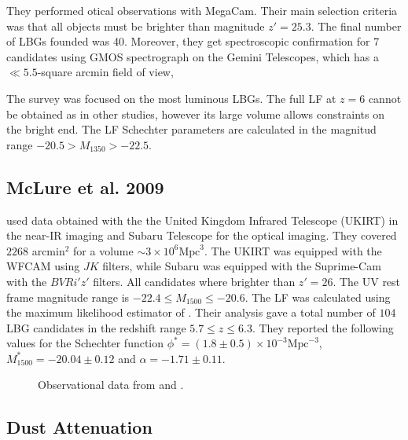 \documentclass{emulateapj}
\begin{document}
They performed otical observations with MegaCam.
Their main selection criteria was that all objects must be brighter
than magnitude $z' = 25.3$. 
The final  number of LBGs founded was 40. 
Moreover, they get spectroscopic confirmation 
for 7 candidates using GMOS spectrograph on the Gemini Telescopes, which 
has a $\ll 5.5$-square arcmin field of view, 

The survey was focused on the most luminous LBGs. 
The full LF at $z=6$ cannot be obtained as in other studies, however
its large volume allows constraints on the bright end.
The LF Schechter parameters are calculated in the magnitud range 
$-20.5 > M_{1350} > -22.5$.

\subsection{McLure et al. 2009}

\citet{McLure09} used data obtained with the 
the United Kingdom Infrared Telescope (UKIRT) in the near-IR imaging
and Subaru Telescope for the optical imaging. 
They covered $2268$ arcmin$^{2}$  for a volume $\sim 3 \times 10^6 \textrm{Mpc}^3$.
The UKIRT was equipped with the WFCAM using $J K$ filters, while Subaru was 
equipped with the Suprime-Cam with the $B V R i' z'$ filters. 
All candidates  where brighter than $z'=26$. 
The UV rest frame magnitude range is 
$-22.4\leq M_{1500} \leq-20.6$. 
The LF was calculated using the maximum 
likelihood estimator of \citet{Schmidt68}. 
Their analysis gave a total number of 
$104$ LBG candidates in the redshift range $5.7\leq z \leq 6.3$. 
They reported the following values for the Schechter function
$\phi^* =(1.8\pm 0.5)\times 10 ^{-3} \textrm{Mpc}^{-3}$, 
$M^*_{1500} = -20.04\pm 0.12$ and $\alpha = -1.71 \pm 0.11$. 


\begin{figure}
\caption{Observational data from \cite{Bouwens15,McLure09}and \cite{Willott13}.}
\label{graph_observational_data}
\end{figure}

\subsection{Dust Attenuation}
\end{document}
